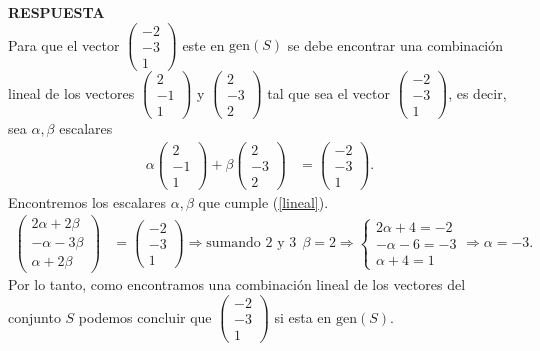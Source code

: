 \documentclass[11pt,letterpaper]{article}
\newcommand{\res}{\textbf{RESPUESTA}\\}
\newcommand{\gen}{\text{gen}}
\begin{document}
\begin{enumerate}
\res 
Para que el vector $\begin{pmatrix}
-2\\
-3\\
1
\end{pmatrix}$
 este en $\gen (S)$ se debe encontrar una combinación lineal de los vectores 
$\begin{pmatrix}
2\\
-1\\
1
\end{pmatrix}$ y $\begin{pmatrix}
2\\
-3\\
2
\end{pmatrix}$ tal que sea el vector $\begin{pmatrix}
-2\\
-3\\
1
\end{pmatrix}$, es decir, sea $\alpha, \beta$ escalares 
\begin{align}\label{lineal}
\alpha \begin{pmatrix}
2\\
-1\\
1
\end{pmatrix}+\beta \begin{pmatrix}
2\\
-3\\
2
\end{pmatrix}&=\begin{pmatrix}
-2\\
-3\\
1
\end{pmatrix}.
\end{align}
Encontremos los escalares $\alpha, \beta$ que cumple (\ref{lineal}).
\begin{align*}
\begin{pmatrix}
2\alpha+2\beta\\
-\alpha-3\beta\\
\alpha+2\beta
\end{pmatrix}&=\begin{pmatrix}
-2\\
-3\\
1
\end{pmatrix}\Rightarrow\text{sumando 2 y 3}\ \ 
\beta=2 \Rightarrow \left\{\begin{matrix}
2\alpha+4=-2\\
-\alpha-6=-3\\
\alpha+4=1
\end{matrix}\right.\Rightarrow\alpha=-3.
\end{align*}
Por lo tanto, como encontramos una combinación lineal de los vectores del conjunto $S$ podemos concluir que $\begin{pmatrix}
-2\\
-3\\
1
\end{pmatrix}$ si esta en $\gen (S).$\\


\end{enumerate}
\end{document}
